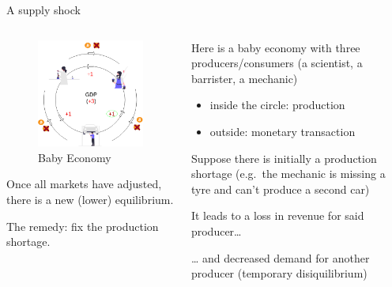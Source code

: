 \begin{frame}{A supply shock}
\begin{columns}[T]
\begin{column}{0.48\textwidth}
\begin{overprint}

\begin{figure}
\centering
\includegraphics[width=1\textwidth,height=\textheight]{assets/circular_supply_5.png}
\caption{Baby Economy}
\end{figure}

\end{overprint}


Once all markets have adjusted, there is a new (lower) equilibrium.


The remedy: fix the production shortage.
\end{column}

\begin{column}{0.48\textwidth}

Here is a baby economy with three producers/consumers (a scientist, a
barrister, a mechanic)

\begin{itemize}
\tightlist
\item
  inside the circle: production
\item
  outside: monetary transaction
\end{itemize}


Suppose there is initially a production shortage (e.g.~the mechanic is
missing a tyre and can't produce a second car)


It leads to a loss in revenue for said producer\ldots{}


\ldots{} and decreased demand for another producer (temporary
disiquilibrium)
\end{column}
\end{columns}
\end{frame}

